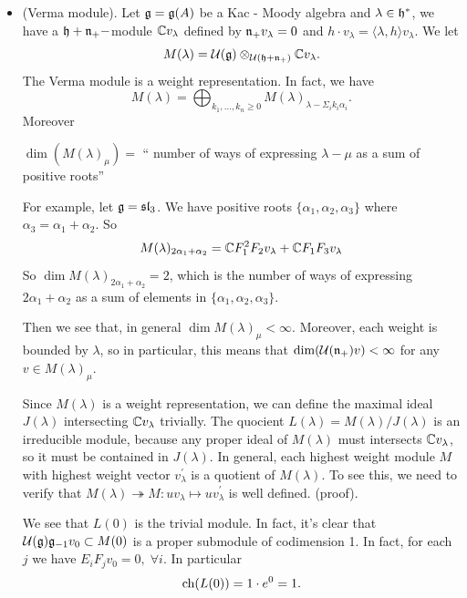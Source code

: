 \begin{itemize}
    \item(Verma module). Let $\mathfrak{g}=\mathfrak{g}(A)$ be a Kac - Moody algebra and $\lambda\in\mathfrak{h}^*$, we have a $\mathfrak{h}+\mathfrak{n}_+-$module 
    $\mathbb{C} v_\lambda$ defined by $\mathfrak{n}_+v_\lambda=0$ and $h\cdot v_\lambda = \langle\lambda,h\rangle v_\lambda$. We let 
    \begin{equation}
        M(\lambda) = \mathcal{U}(\mathfrak{g})\otimes_{\mathcal{U}(\mathfrak{h}+\mathfrak{n}_+)}\mathbb{C} v_\lambda.
    \end{equation}
    The Verma module is a weight representation. In fact, we have 
    \begin{equation}
        M(\lambda) = \bigoplus_{k_1,\dots,k_n\geq0}M(\lambda)_{\lambda-\Sigma_ik_i\alpha_i}.
    \end{equation}
    Moreover 
    \begin{center}
        $\dim(M(\lambda)_{\mu})=$ `` number of ways of expressing $\lambda - \mu$ as a sum of positive roots''
     \end{center}
    For example, let $\mathfrak{g} = \mathfrak{sl}_3$. We have positive roots $\{\alpha_1,\alpha_2,\alpha_3\}$ where 
    $\alpha_3 = \alpha_1+\alpha_2$. So 
    \begin{equation}
        M(\lambda)_{2\alpha_1 + \alpha_2} = \mathbb{C} F_1^2F_2 v_\lambda + \mathbb{C} F_1F_3 v_\lambda 
    \end{equation}
    So $\dim M(\lambda)_{2\alpha_1 + \alpha_2} = 2$, which is the number of ways of expressing $2\alpha_1+\alpha_2$ as a sum 
    of elements in $\{\alpha_1,\alpha_2,\alpha_3\}$.\par 
    Then we see that, in general $\dim M(\lambda)_\mu<\infty$. Moreover, each weight is bounded by $\lambda$, so in particular, 
    this means that $\dim(\mathcal{U}(\mathfrak{n}_+)v) <\infty$ for any $v\in M(\lambda)_\mu$.\par 
    Since $M(\lambda)$ is a weight representation, we can define the maximal ideal $J(\lambda)$ 
    intersecting $\mathbb{C} v_\lambda$ trivially. The quocient $L(\lambda) = M(\lambda)/J(\lambda)$ is an irreducible module, because 
    any proper ideal of $M(\lambda)$ must intersects $\mathbb{C} v_\lambda$, so it must be contained in $J(\lambda)$. In general, each 
    highest weight module $M$ with highest weight vector $v_\lambda^\prime$ is a quotient of $M(\lambda)$. To see this, we need to 
    verify that $M(\lambda)\twoheadrightarrow M: u v_\lambda\mapsto u v_\lambda^\prime$ is well defined. (\TODO proof).

\begin{remark}
    We see that $L(0)$ is the trivial module. In fact, it's clear that $\mathcal{U}(\mathfrak{g})\mathfrak{g}_{-1}v_0\subset M(0)$ is 
    a proper submodule of codimension 1. In fact, for each $j$ we have $E_iF_jv_0 = 0,\;\forall i$. In particular 
    \begin{equation}
        \text{ch}(L(0)) = 1\cdot e^0 =1.
    \end{equation}
\end{remark}




\end{itemize}
